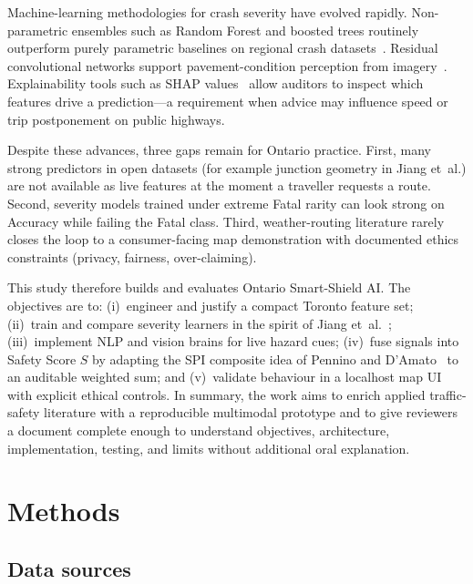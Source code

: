 \documentclass[11pt,a4paper]{article}
\begin{document}
Machine-learning methodologies for crash severity have evolved rapidly. Non-parametric ensembles such as Random Forest and boosted trees routinely outperform purely parametric baselines on regional crash datasets~\citep{jiang2024traffic}. Residual convolutional networks support pavement-condition perception from imagery~\citep{he2016resnet}. Explainability tools such as SHAP values~\citep{lundberg2017shap} allow auditors to inspect which features drive a prediction---a requirement when advice may influence speed or trip postponement on public highways.

Despite these advances, three gaps remain for Ontario practice. First, many strong predictors in open datasets (for example junction geometry in Jiang et~al.) are not available as live features at the moment a traveller requests a route. Second, severity models trained under extreme Fatal rarity can look strong on Accuracy while failing the Fatal class. Third, weather-routing literature rarely closes the loop to a consumer-facing map demonstration with documented ethics constraints (privacy, fairness, over-claiming).

This study therefore builds and evaluates Ontario Smart-Shield AI. The objectives are to: (i)~engineer and justify a compact Toronto feature set; (ii)~train and compare severity learners in the spirit of Jiang et~al.~\citep{jiang2024traffic}; (iii)~implement NLP and vision brains for live hazard cues; (iv)~fuse signals into Safety Score $S$ by adapting the SPI composite idea of Pennino and D'Amato~\citep{pennino2024weather} to an auditable weighted sum; and (v)~validate behaviour in a localhost map UI with explicit ethical controls. In summary, the work aims to enrich applied traffic-safety literature with a reproducible multimodal prototype and to give reviewers a document complete enough to understand objectives, architecture, implementation, testing, and limits without additional oral explanation.

\section{Methods}
\label{sec:methods}

\subsection{Data sources}
\label{sec:data}
\end{document}
